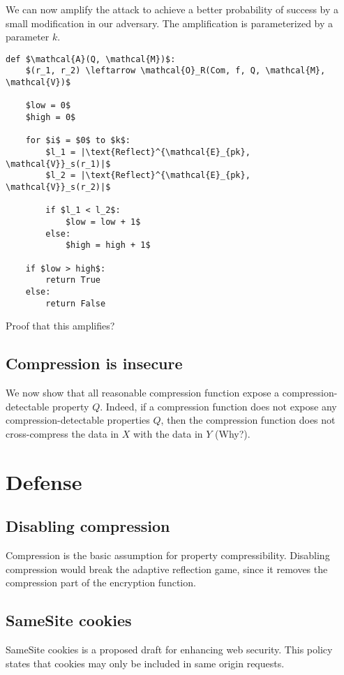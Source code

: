 \documentclass{sig-alternate-05-2015}
\begin{document}
We can now amplify the attack to achieve a better probability of success by a
small modification in our adversary. The amplification is parameterized by a
parameter $k$.

\begin{lstlisting}[texcl,mathescape]
def $\mathcal{A}(Q, \mathcal{M})$:
    $(r_1, r_2) \leftarrow \mathcal{O}_R(Com, f, Q, \mathcal{M}, \mathcal{V})$

    $low = 0$
    $high = 0$

    for $i$ = $0$ to $k$:
        $l_1 = |\text{Reflect}^{\mathcal{E}_{pk}, \mathcal{V}}_s(r_1)|$
        $l_2 = |\text{Reflect}^{\mathcal{E}_{pk}, \mathcal{V}}_s(r_2)|$

        if $l_1 < l_2$:
            $low = low + 1$
        else:
            $high = high + 1$

    if $low > high$:
        return True
    else:
        return False
\end{lstlisting}

Proof that this amplifies?

\subsection{Compression is insecure}\label{subsec:cominsecure}

We now show that all reasonable compression function expose a
compression-detectable property $Q$. Indeed, if a compression function does not
expose any compression-detectable properties $Q$, then the compression function
does not cross-compress the data in $X$ with the data in $Y$ (Why?).

\section{Defense}\label{sec:defense}

\subsection{Disabling compression}\label{subsec:disablecom}
Compression is the basic assumption for property compressibility. Disabling
compression would break the adaptive reflection game, since it removes
the compression part of the encryption function.

\subsection{SameSite cookies}\label{subsec:samesite}
SameSite cookies \cite{c1} is a proposed draft for enhancing web security. This policy
states that cookies may only be included in same origin requests.
\end{document}
